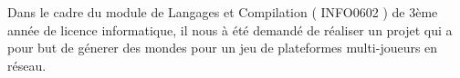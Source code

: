 Dans le cadre du module de Langages et Compilation ( INFO0602 ) de 3ème année de licence informatique, il nous à été demandé de réaliser un projet qui a pour but de génerer des mondes pour un jeu de plateformes multi-joueurs en réseau.
\\[1cm]



\newpage
